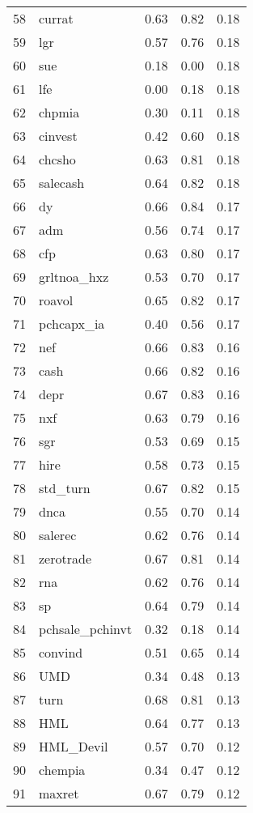 \documentclass[12pt]{article}
\begin{document}
\begin{footnotesize}
\begin{longtable}{rl|c|c|c}
  58 & currat & 0.63 & 0.82 & 0.18 \\ 
  59 & lgr & 0.57 & 0.76 & 0.18 \\ 
  60 & sue & 0.18 & 0.00 & 0.18 \\ 
  61 & lfe & 0.00 & 0.18 & 0.18 \\ 
  62 & chpmia & 0.30 & 0.11 & 0.18 \\ 
  63 & cinvest & 0.42 & 0.60 & 0.18 \\ 
  64 & chcsho & 0.63 & 0.81 & 0.18 \\ 
  65 & salecash & 0.64 & 0.82 & 0.18 \\ 
  66 & dy & 0.66 & 0.84 & 0.17 \\ 
  67 & adm & 0.56 & 0.74 & 0.17 \\ 
  68 & cfp & 0.63 & 0.80 & 0.17 \\ 
  69 & grltnoa\_hxz & 0.53 & 0.70 & 0.17 \\ 
  70 & roavol & 0.65 & 0.82 & 0.17 \\ 
  71 & pchcapx\_ia & 0.40 & 0.56 & 0.17 \\ 
  72 & nef & 0.66 & 0.83 & 0.16 \\ 
  73 & cash & 0.66 & 0.82 & 0.16 \\ 
  74 & depr & 0.67 & 0.83 & 0.16 \\ 
  75 & nxf & 0.63 & 0.79 & 0.16 \\ 
  76 & sgr & 0.53 & 0.69 & 0.15 \\ 
  77 & hire & 0.58 & 0.73 & 0.15 \\ 
  78 & std\_turn & 0.67 & 0.82 & 0.15 \\ 
  79 & dnca & 0.55 & 0.70 & 0.14 \\ 
  80 & salerec & 0.62 & 0.76 & 0.14 \\ 
  81 & zerotrade & 0.67 & 0.81 & 0.14 \\ 
  82 & rna & 0.62 & 0.76 & 0.14 \\ 
  83 & sp & 0.64 & 0.79 & 0.14 \\ 
  84 & pchsale\_pchinvt & 0.32 & 0.18 & 0.14 \\ 
  85 & convind & 0.51 & 0.65 & 0.14 \\ 
  86 & UMD & 0.34 & 0.48 & 0.13 \\ 
  87 & turn & 0.68 & 0.81 & 0.13 \\ 
  88 & HML & 0.64 & 0.77 & 0.13 \\ 
  89 & HML\_Devil & 0.57 & 0.70 & 0.12 \\ 
  90 & chempia & 0.34 & 0.47 & 0.12 \\ 
  91 & maxret & 0.67 & 0.79 & 0.12 \\ 

\end{longtable}
\end{footnotesize}
\end{document}

